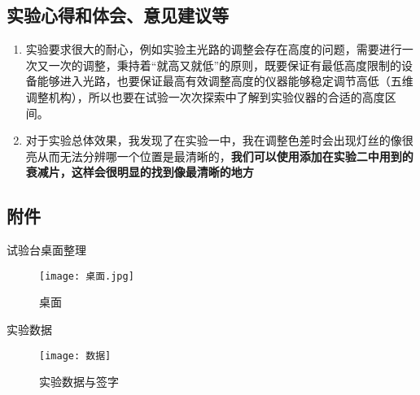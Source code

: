 \documentclass[dvipsnames, svgnames,a4paper,11pt]{article}
\begin{document}
	\subsection{实验心得和体会、意见建议等}
	\begin{enumerate}
		\item 实验要求很大的耐心，例如实验主光路的调整会存在高度的问题，需要进行一次又一次的调整，秉持着“就高又就低”的原则，既要保证有最低高度限制的设备能够进入光路，也要保证最高有效调整高度的仪器能够稳定调节高低（五维调整机构），所以也要在试验一次次探索中了解到实验仪器的合适的高度区间。
		\item 对于实验总体效果，我发现了在实验一中，我在调整色差时会出现灯丝的像很亮从而无法分辨哪一个位置是最清晰的，\textbf{我们可以使用添加在实验二中用到的衰减片，这样会很明显的找到像最清晰的地方}
	\end{enumerate}
	

	\subsection{附件}
	试验台桌面整理
	\begin{figure}[{H}]
		\centering
		\texttt{[image: 桌面.jpg]}
		\caption{桌面}
		\label{}
	\end{figure}
	实验数据
	\begin{figure}[{H}]
		\centering
		\texttt{[image: 数据]}
		\caption{实验数据与签字}
		\label{}
	\end{figure}
	

	
\end{document}
